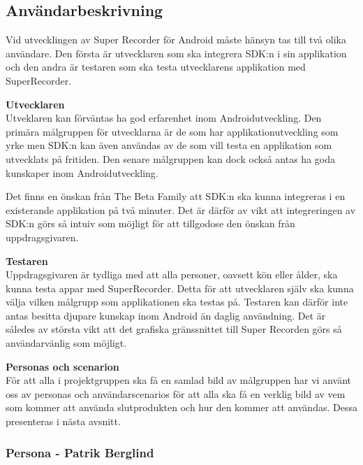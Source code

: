 \subsection{Användarbeskrivning}
\label{subsec:userdesc}

Vid utvecklingen av Super Recorder för Android måste hänsyn tas till två olika användare. Den första är utvecklaren som ska integrera SDK:n i sin applikation och den andra är testaren som ska testa utvecklarens applikation med SuperRecorder.

\textbf{Utvecklaren} \\
Utveklaren kan förväntas ha god erfarenhet inom Androidutveckling. Den primära målgruppen för utvecklarna är de som har applikationutveckling som yrke men SDK:n kan även användas av de som vill testa en applikation som utvecklats på fritiden. Den senare målgruppen kan dock också antas ha goda kunskaper inom Androidutveckling. 

Det finns en önskan från The Beta Family att SDK:n ska kunna integreras i en existerande applikation på två minuter. Det är därför av vikt att integreringen av SDK:n görs så intuiv som möjligt för att tillgodose den önskan från uppdragsgivaren.

\textbf{Testaren} \\
Uppdragsgivaren är tydliga med att alla personer, oavsett kön eller ålder, ska kunna testa appar med SuperRecorder. Detta för att utvecklaren själv ska kunna välja vilken målgrupp som applikationen ska testas på. Testaren kan därför inte antas besitta djupare kunskap inom Android än daglig användning. Det är således av största vikt att det grafiska gränssnittet till Super Recorden görs så användarvänlig som möjligt.

\textbf{Personas och scenarion} \\
För att alla i projektgruppen ska få en samlad bild av målgruppen har vi använt oss av personas och användarscenarios för att alla ska få en verklig bild av vem som kommer att använda slutprodukten och hur den kommer att användas. Dessa presenteras i nästa avsnitt.
\newpage	
\subsubsection{Persona - Patrik Berglind}

\vspace{40px}

